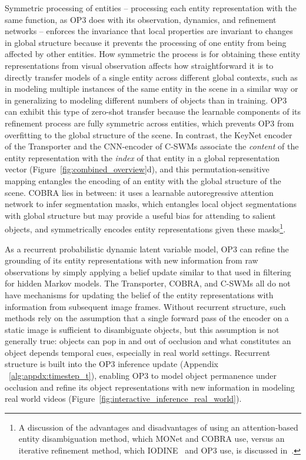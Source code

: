 Symmetric processing of entities -- processing each entity representation with the same function, as OP3 does with its observation, dynamics, and refinement networks -- enforces the invariance that local properties are invariant to changes in global structure because it prevents the processing of one entity from being affected by other entities.
How symmetric the process is for obtaining these entity representations from visual observation affects how straightforward it is to directly transfer models of a single entity across different global contexts, such as in modeling multiple instances of the same entity in the scene in a similar way or in generalizing to modeling different numbers of objects than in training.
OP3 can exhibit this type of zero-shot transfer because the learnable components of its refinement process are fully symmetric across entities, which prevents OP3 from overfitting to the global structure of the scene.
In contrast, the KeyNet encoder of the Transporter and the CNN-encoder of C-SWMs associate the \textit{content} of the entity representation with the \textit{index} of that entity in a global representation vector (Figure~\ref{fig:combined_overview}d), and this permutation-sensitive mapping entangles the encoding of an entity with the global structure of the scene.
COBRA lies in between: it uses a learnable autoregressive attention network to infer segmentation masks, which entangles local object segmentations with global structure but may provide a useful bias for attending to salient objects, and symmetrically encodes entity representations given these masks\footnote{A discussion of the advantages and disadvantages of using an attention-based entity disambiguation method, which MONet and COBRA use, versus an iterative refinement method, which IODINE~\citep{greff2019iodine} and OP3 use, is discussed in~\citet{greff2019iodine}.}.

As a recurrent probabilistic dynamic latent variable model, OP3 can refine the grounding of its entity representations with new information from raw observations by simply applying a belief update similar to that used in filtering for hidden Markov models.
The Transporter, COBRA, and C-SWMs all do not have mechanisms for updating the belief of the entity representations with information from subsequent image frames.
Without recurrent structure, such methods rely on the assumption that a single forward pass of the encoder on a static image is sufficient to disambiguate objects, but this assumption is not generally true: objects can pop in and out of occlusion and what constitutes an object depends temporal cues, especially in real world settings.
Recurrent structure is built into the OP3 inference update (Appendix ~\ref{alg:appdx:timestep_t}), enabling OP3 to model object permanence under occlusion and refine its object representations with new information in modeling real world videos (Figure~\ref{fig:interactive_inference_real_world}).